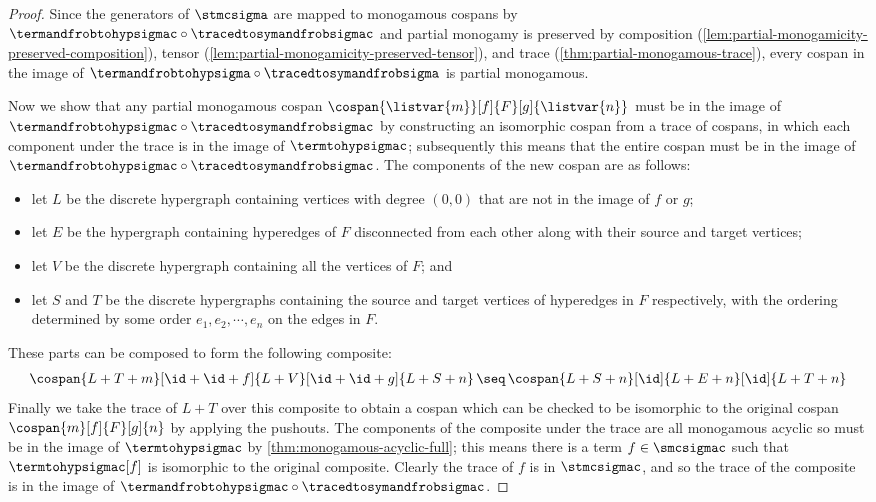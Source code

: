 \begin{proof}
    Since the generators of \(\stmcsigma\) are mapped to monogamous cospans
    by \(\termandfrobtohypsigmac \circ \tracedtosymandfrobsigmac\) and partial
    monogamy is preserved by composition
    (\cref{lem:partial-monogamicity-preserved-composition}),
    tensor (\cref{lem:partial-monogamicity-preserved-tensor}),
    and trace
    (\cref{thm:partial-monogamous-trace}),
    every cospan in the image of
    \(\termandfrobtohypsigma \circ \tracedtosymandfrobsigma\) is partial
    monogamous.

    Now we show that any partial monogamous cospan \(
        \cospan{\listvar{m}}[f]{F}[g]{\listvar{n}}
    \) must be in the image of \(
        \termandfrobtohypsigmac \circ \tracedtosymandfrobsigmac
    \) by constructing an isomorphic cospan from a trace of cospans, in which
    each component under the trace is in the image of \(\termtohypsigmac\);
    subsequently this means that the entire cospan must be in the image of
    \(\termandfrobtohypsigmac \circ \tracedtosymandfrobsigmac\).
    The components of the new cospan are as follows:
    \begin{itemize}
        \item let \(L\) be the discrete hypergraph containing vertices with
                degree
                \((0,0)\) that are not in the image of \(f\) or \(g\);
        \item let \(E\) be the hypergraph containing hyperedges of \(F\)
                disconnected from each other along with their source and target
                vertices;
        \item let \(V\) be the discrete hypergraph containing all the
                vertices of \(F\); and
        \item let \(S\) and \(T\) be the discrete hypergraphs containing
                the source and target vertices of hyperedges in \(F\)
                respectively, with the ordering determined by some order
                \(e_1,e_2,\cdots,e_n\) on the edges in \(F\).
    \end{itemize}
    These parts can be composed to form the following composite:
    \begin{gather*}
        \cospan{L + T + m}[\id + \id + f]{L + V}[\id + \id + g]{L + S + n}
        \,\seq\,
        \cospan{L + S + n}[\id]{L + E + n}[\id]{L + T + n}
    \end{gather*}
    Finally we take the trace of \(L + T\) over this composite to obtain a
    cospan which can be checked to be isomorphic to the original cospan
    \(\cospan{m}[f]{F}[g]{n}\) by applying the pushouts.
    The components of the composite under the trace are all monogamous acyclic
    so must be in the image of \(\termtohypsigmac\) by
    \cref{thm:monogamous-acyclic-full}; this means there is a term
    \(f \in \smcsigmac\) such that \(\termtohypsigmac[f]\) is isomorphic to the
    original composite.
    Clearly the trace of \(f\) is in \(\stmcsigmac\), and so the trace of the
    composite is in the image of
    \(\termandfrobtohypsigmac \circ \tracedtosymandfrobsigmac\).
\end{proof}

